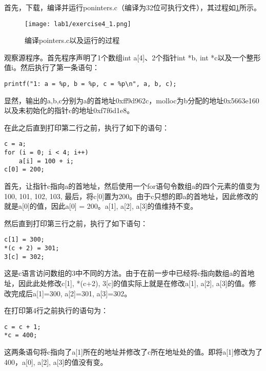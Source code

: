 \begin{exerciseSolution}{4}
\par 首先，下载，编译并运行poninters.c（编译为32位可执行文件），其过程如\ref{fig:exercise4_1}所示。
\begin{figure}[htb]
    \centering
    \texttt{[image: lab1/exercise4\_1.png]}
    \caption{编译pointers.c以及运行的过程}
    \label{fig:exercise4_1}
\end{figure}

\par 观察源程序。首先程序声明了1个数组int a[4]、2个指针int *b, int *c以及一个整形值i。然后执行了第一条语句：
\begin{lstlisting}
printf("1: a = %p, b = %p, c = %p\n", a, b, c);
\end{lstlisting}
\par 显然，输出的a,b,c分别为a的首地址0xff9d962c，molloc为b分配的地址0x5663e160以及未初始化的指针c的地址0xf7f6d1e8。

\par 在此之后直到打印第二行之前，执行了如下的语句：
\begin{lstlisting}
c = a;
for (i = 0; i < 4; i++)
    a[i] = 100 + i;
c[0] = 200;
\end{lstlisting}
\par 首先，让指针c指向a的首地址，然后使用一个for语句令数组a的四个元素的值变为100, 101, 102, 103, 最后，将c[0]置为200。由于c只想的即a的首地址，因此修改的就是a[0]的值，因此a[0] = 200。a[1], a[2], a[3]的值维持不变。

\par 然后直到打印第三行之前，执行了如下语句：
\begin{lstlisting}
c[1] = 300;
*(c + 2) = 301;
3[c] = 302;
\end{lstlisting}
\par 这是c语言访问数组的3中不同的方法。由于在前一步中已经将c指向数组a的首地址，因此此处修改c[1], *(c+2), 3[c]的值实际上就是在修改a[1], a[2], a[3]的值。修改完成后a[1]=300, a[2]=301, a[3]=302。

\par 在打印第4行之前执行的语句为：
\begin{lstlisting}
c = c + 1;
*c = 400;
\end{lstlisting}
\par 这两条语句将c指向了a[1]所在的地址并修改了c所在地址处的值。即将a[1]修改为了400，a[0], a[2], a[3]的值没有变。


\end{exerciseSolution}
